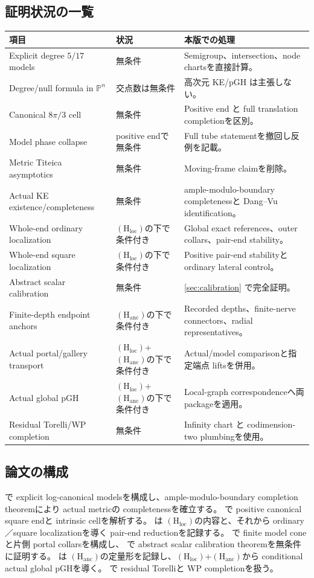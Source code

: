 \documentclass[11pt,a4paper]{ltjsarticle}
\newcommand{\PP}{\mathbb P}\newcommand{\RR}{\mathbb R}\newcommand{\CC}{\mathbb C}
\newcommand{\Hloc}{\ensuremath{(\mathrm H_{\mathrm{loc}})}}
\newcommand{\Hanc}{\ensuremath{(\mathrm H_{\mathrm{anc}})}}
\theoremstyle{plain}
\theoremstyle{definition}
\theoremstyle{remark}
\begin{document}
\subsection{証明状況の一覧}
\begin{center}
\begin{tabularx}{\textwidth}{@{}p{}p{}X@{}}
\toprule
項目 & 状況 & 本版での処理\\ \midrule
Explicit degree $5/17$ models & 無条件 & Semigroup、intersection、node chartsを直接計算。\\
Degree/null formula in $\PP^n$ & 交点数は無条件 & 高次元 KE/pGH は主張しない。\\
Canonical $8\pi/3$ cell & 無条件 & Positive end と full translation completionを区別。\\
Model phase collapse & positive endで無条件 & Full tube statementを撤回し反例を記載。\\
Metric Titeica asymptotics & 無条件 & Moving-frame claimを削除。\\
Actual KE existence/completeness & 無条件 & ample-modulo-boundary completenessと Dang--Vu identification。\\
Whole-end ordinary localization & \Hloc の下で条件付き & Global exact references、outer collars、pair-end stability。\\
Whole-end square localization & \Hloc の下で条件付き & Positive pair-end stabilityと ordinary lateral control。\\
Abstract scalar calibration & 無条件 & \cref{sec:calibration} で完全証明。\\
Finite-depth endpoint anchors & \Hanc の下で条件付き & Recorded depths、finite-nerve connectors、radial representatives。\\
Actual portal/gallery transport & \Hloc+\Hanc の下で条件付き & Actual/model comparisonと指定端点 liftsを併用。\\
Actual global pGH & \Hloc+\Hanc の下で条件付き & Local-graph correspondenceへ両 packageを適用。\\
Residual Torelli/WP completion & 無条件 & Infinity chart と codimension-two plumbingを使用。\\ \bottomrule
\end{tabularx}
\end{center}

\subsection{論文の構成}
 で explicit log-canonical modelsを構成し、ample-modulo-boundary completion theoremにより actual metricの completenessを確立する。 で positive canonical square endと intrinsic cellを解析する。 は \Hloc の内容と、それから ordinary／square localizationを導く pair-end reductionを記録する。 で finite model coneと片側 portal collarsを構成し、 で abstract scalar calibration theoremを無条件に証明する。 は \Hanc の定量形を記録し、\Hloc+\Hanc から conditional actual global pGHを導く。 で residual Torelliと WP completionを扱う。
\end{document}
